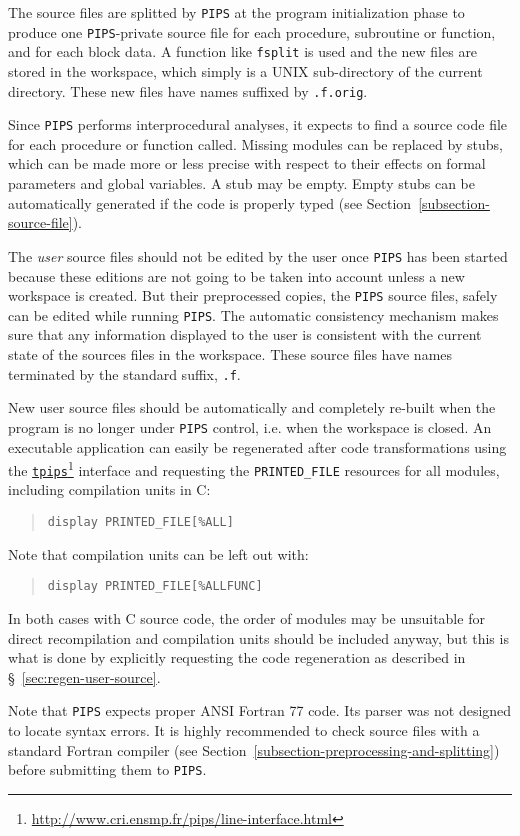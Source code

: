 \documentclass[a4paper]{report}
\newcommand{\LINK}[2]{\href{#2}{#1}\footnote{\url{#2}}\xspace}
\newcommand{\Pips}{\texttt{PIPS}}
\newcommand{\TPIPS}{\LINK{\texttt{tpips}}{http://www.cri.ensmp.fr/pips/line-interface.html}}
\begin{document}
The source files are splitted by \Pips{} at the
program initialization phase to produce one \Pips{}-private source file
for each procedure, subroutine or function, and for each block data. A
function like \verb+fsplit+ is used and the new files are stored in the
workspace, which simply is a UNIX sub-directory of the current directory.
These new files have names suffixed by {\tt .f.orig}.

Since \Pips{} performs interprocedural analyses, it expects to find a
source code file for each procedure or function called. Missing modules
can be replaced by stubs, which can be made more or less precise with
respect to their effects on formal parameters and global variables. A
stub may be empty. Empty stubs can be automatically generated if the code
is properly typed (see Section~\ref{subsection-source-file}).

The {\em user} source files should not be edited by the user once \Pips{}
has been started because these editions are not going to be taken into
account unless a new workspace is created.
But their preprocessed copies, the
\Pips{} source files, safely can be edited while running \Pips{}. The
automatic consistency mechanism makes sure that any information
displayed to the user is consistent with the current state of the
sources files in the workspace. These source files have names terminated
by the standard suffix, {\tt .f}.

New user source files should be automatically and completely re-built when the program
is no longer under \Pips{} control, i.e. when the
workspace is closed. An executable application can easily be regenerated
after code transformations using the \TPIPS{} interface and requesting the
{\tt PRINTED\_FILE} resources for all modules, including compilation units in C:
\begin{quote}
{\tt display PRINTED\_FILE[\%ALL]}
\end{quote}
Note that compilation units can be left out with:
\begin{quote}
{\tt display PRINTED\_FILE[\%ALLFUNC]}
\end{quote}
In both cases with C source code, the order of modules may be unsuitable
for direct recompilation and compilation units should be included anyway,
but this is what is done by explicitly requesting the code regeneration as
described in \S~\ref{sec:regen-user-source}.

Note that \Pips{} expects proper ANSI Fortran 77 code. Its parser was not
designed to locate syntax errors. It is highly recommended to check source
files with a standard Fortran compiler (see
Section~\ref{subsection-preprocessing-and-splitting}) before submitting them to
\Pips{}.
\end{document}
